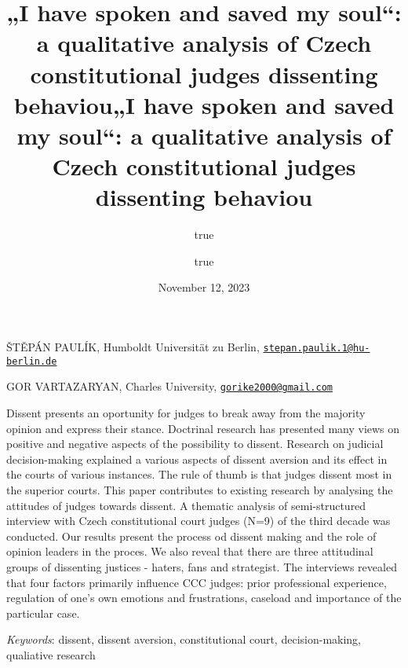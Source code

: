 \documentclass[
  11pt,
]{article}
\title{„I have spoken and saved my soul``: a qualitative analysis of
Czech constitutional judges dissenting behaviou}
\author{true \and true}
\date{November 12, 2023}
\title{„I have spoken and saved my soul``: a qualitative analysis of
Czech constitutional judges dissenting behaviou }
\date{}
\renewenvironment{abstract}
 {{%
    \setlength{\leftmargin}{0mm}
    \setlength{\rightmargin}{\leftmargin}%
  }%
  \relax}
 {\endlist}
\begin{document}



{%
\setlength{\parindent}{0pt}
\thispagestyle{plain}
{%
\maketitle  %

}




{
   \vskip 13.5pt\relax \normalsize\fontsize{11}{12}
   \MakeUppercase{Štěpán Paulík}, \small{Humboldt Universität zu Berlin,
\href{mailto:stepan.paulik.1@hu-berlin.de}{\nolinkurl{stepan.paulik.1@hu-berlin.de}}}   \par \vskip -3.5pt \MakeUppercase{Gor
Vartazaryan}, \small{Charles University,
\href{mailto:gorike2000@gmail.com}{\nolinkurl{gorike2000@gmail.com}}}   

}

}








\begin{abstract}


    \vskip 8.5pt %

\noindent \small{Dissent presents an oportunity for judges to break away
from the majority opinion and express their stance. Doctrinal research
has presented many views on positive and negative aspects of the
possibility to dissent. Research on judicial decision-making explained a
various aspects of dissent aversion and its effect in the courts of
various instances. The rule of thumb is that judges dissent most in the
superior courts. This paper contributes to existing research by
analysing the attitudes of judges towards dissent. A thematic analysis
of semi-structured interview with Czech constitutional court judges
(N=9) of the third decade was conducted. Our results present the process
od dissent making and the role of opinion leaders in the proces. We also
reveal that there are three attitudinal groups of dissenting justices -
haters, fans and strategist. The interviews revealed that four factors
primarily influence CCC judges: prior professional experience,
regulation of one's own emotions and frustrations, caseload and
importance of the particular case.}


\vskip 8.5pt \noindent \emph{Keywords}: dissent, dissent aversion,
constitutional court, decision-making, qualiative research \par




\end{abstract}
\end{document}
